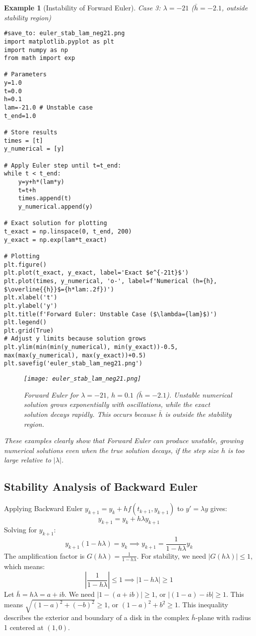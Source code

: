 \documentclass{article}
\newtheorem{example}{Example}
\begin{document}
\begin{example}[Instability of Forward Euler]
\textit{Case 3: $\lambda = -21$ ($\bar{h} = -2.1$, outside stability region)}
\begin{verbatim}
#save_to: euler_stab_lam_neg21.png
import matplotlib.pyplot as plt
import numpy as np
from math import exp

# Parameters
y=1.0
t=0.0
h=0.1
lam=-21.0 # Unstable case
t_end=1.0

# Store results
times = [t]
y_numerical = [y]

# Apply Euler step until t=t_end:
while t < t_end:
    y=y+h*(lam*y)
    t=t+h
    times.append(t)
    y_numerical.append(y)

# Exact solution for plotting
t_exact = np.linspace(0, t_end, 200)
y_exact = np.exp(lam*t_exact)

# Plotting
plt.figure()
plt.plot(t_exact, y_exact, label='Exact $e^{-21t}$')
plt.plot(times, y_numerical, 'o-', label=f'Numerical (h={h}, $\overline{{h}}$={h*lam:.2f})')
plt.xlabel('t')
plt.ylabel('y')
plt.title(f'Forward Euler: Unstable Case ($\lambda={lam}$)')
plt.legend()
plt.grid(True)
# Adjust y limits because solution grows
plt.ylim(min(min(y_numerical), min(y_exact))-0.5, max(max(y_numerical), max(y_exact))+0.5)
plt.savefig('euler_stab_lam_neg21.png')
\end{verbatim}
\begin{figure}[h] \centering \texttt{[image: euler\_stab\_lam\_neg21.png]} \caption{Forward Euler for $\lambda=-21$, $h=0.1$ ($\bar{h}=-2.1$). Unstable numerical solution grows exponentially with oscillations, while the exact solution decays rapidly. This occurs because $\bar{h}$ is outside the stability region.} \label{fig:euler_stab_lam_neg21} \end{figure}

These examples clearly show that Forward Euler can produce unstable, growing numerical solutions even when the true solution decays, if the step size $h$ is too large relative to $|\lambda|$.
\end{example}

\subsection{Stability Analysis of Backward Euler}
Applying Backward Euler $y_{k+1} = y_k + h f(t_{k+1}, y_{k+1})$ to $y' = \lambda y$ gives:
\[
y_{k+1} = y_k + h \lambda y_{k+1}
\]
Solving for $y_{k+1}$:
\[
y_{k+1} (1 - h \lambda) = y_k \implies y_{k+1} = \frac{1}{1 - h \lambda} y_k
\]
The amplification factor is $G(h\lambda) = \frac{1}{1 - h \lambda}$. For stability, we need $|G(h\lambda)| \le 1$, which means:
\[
\left| \frac{1}{1 - h \lambda} \right| \le 1 \implies |1 - h \lambda| \ge 1
\]
Let $\bar{h} = h\lambda = a + ib$. We need $|1 - (a+ib)| \ge 1$, or $|(1-a) - ib| \ge 1$. This means $\sqrt{(1-a)^2 + (-b)^2} \ge 1$, or $(1-a)^2 + b^2 \ge 1$.
This inequality describes the exterior and boundary of a disk in the complex $\bar{h}$-plane with radius 1 centered at $(1, 0)$.
\end{document}

